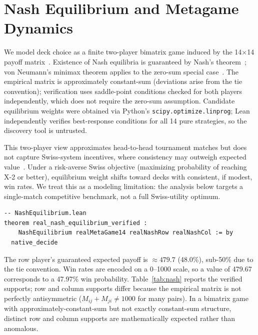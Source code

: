 \documentclass[journal]{IEEEtran}
\let\origsection\section
\renewcommand{\section}{\needspace{4\baselineskip}\origsection}
\begin{document}
\section{Nash Equilibrium and Metagame Dynamics}\label{sec:nash}

We model deck choice as a finite two-player bimatrix game induced by the 14$\times$14 payoff matrix~\cite{NisanRoughgarden2007}.
Existence of Nash equilibria is guaranteed by Nash's theorem~\cite{nash1950equilibrium}; von Neumann's minimax theorem applies to the zero-sum special case~\cite{vonneumann1928theorie}.
The empirical matrix is approximately constant-sum (deviations arise from the tie convention); verification uses saddle-point conditions checked for both players independently, which does not require the zero-sum assumption.
Candidate equilibrium weights were obtained via Python's \texttt{scipy.optimize.linprog}; Lean independently verifies best-response conditions for all 14 pure strategies, so the discovery tool is untrusted.

This two-player view approximates head-to-head tournament matches but does not capture Swiss-system incentives, where consistency may outweigh expected value~\cite{glickman1999parameter,herbrich2007trueskill}.
Under a risk-averse Swiss objective (maximizing probability of reaching X-2 or better), equilibrium weight shifts toward decks with consistent, if modest, win rates.
We treat this as a modeling limitation: the analysis below targets a single-match competitive benchmark, not a full Swiss-utility optimum.

\begin{lstlisting}[caption={Machine-checked Nash equilibrium of the raw $14\times14$ game.},label={lst:realnash}]
-- NashEquilibrium.lean
theorem real_nash_equilibrium_verified :
    NashEquilibrium realMetaGame14 realNashRow realNashCol := by
  native_decide
\end{lstlisting}

The row player's guaranteed expected payoff is ${\approx}479.7$\textperthousand{} (48.0\%), sub-50\% due to the tie convention.
Win rates are encoded on a 0--1000 scale, so a value of 479.67 corresponds to a 47.97\% win probability.
Table~\ref{tab:nash} reports the verified supports; row and column supports differ because the empirical matrix is not perfectly antisymmetric ($M_{ij} + M_{ji} \neq 1000$ for many pairs).
In a bimatrix game with approximately-constant-sum but not exactly constant-sum structure, distinct row and column supports are mathematically expected rather than anomalous.
\end{document}
